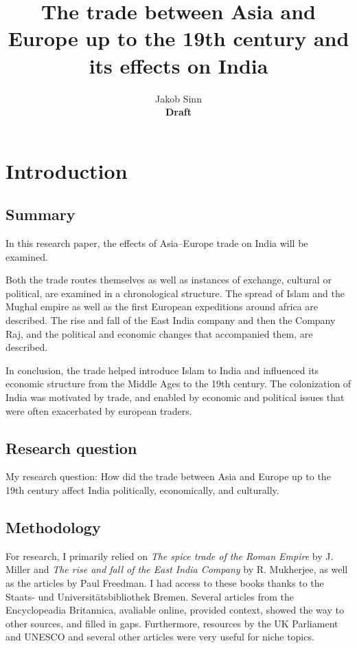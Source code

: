 \documentclass[11pt, a4paper, headings=standardclasses]{scrartcl}
\begin{document}
\renewcommand{\baselinestretch}{1.5}
\subject{Facharbeit}
\author{Jakob Sinn \\ \textbf{Draft}}
\title{The trade between Asia and Europe up to the 19th century and its effects on India}
\maketitle
\thispagestyle{empty}
\clearpage
{}
\tableofcontents
\clearpage
\section{Introduction}
\subsection{Summary}
In this research paper, the effects of Asia--Europe trade on India will be examined.

Both the trade routes themselves as well as instances of exchange, cultural or political, are examined in a chronological structure. The spread of Islam and the Mughal empire as well as the first European expeditions around africa are described. The rise and fall of the East India company and then the Company Raj, and the political and economic changes that accompanied them, are described.

In conclusion, the trade helped introduce Islam to India and influenced its economic structure from the Middle Ages to the 19th century. The colonization of India was motivated by trade, and enabled by economic and political issues that were often exacerbated by european traders.
\subsection{Research question}
My research question: How did the trade between Asia and Europe up to the 19th century affect India politically, economically, and culturally.
\subsection{Methodology}

For research, I primarily relied on \textit{The spice trade of the Roman Empire} by J. Miller and \textit{The rise and fall of the East India Company} by R. Mukherjee, as well as the articles by Paul Freedman. I had access to these books thanks to the Staats- und Universitätsbibliothek Bremen. Several articles from the Encyclopeadia Britannica, avaliable online, provided context, showed the way to other sources, and filled in gaps. Furthermore, resources by the UK Parliament and UNESCO and several other articles were very useful for niche topics.
\end{document}
